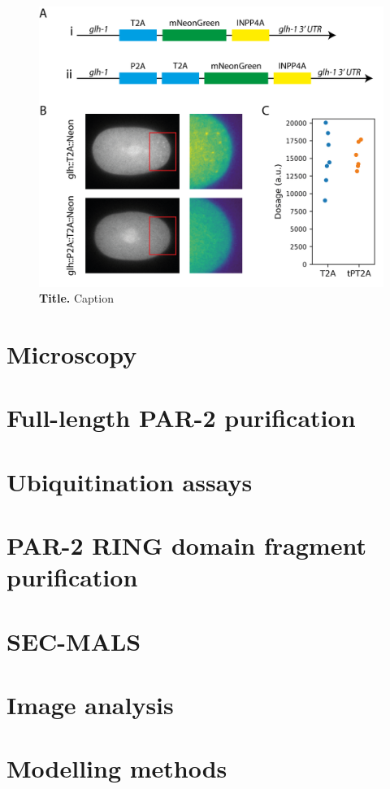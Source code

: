 \documentclass[12pt]{"report"}
\newcommand{\mycaption}[2]{\caption[#1]{\textbf{#1.} #2}}
\begin{document}
\begin{figure}[!h]
\includegraphics[scale=1]{glh}
\setlength{\abovecaptionskip}{20pt}
\centering
\mycaption{Title}{Caption}
\label{fig:glh}
\end{figure}



\section{Microscopy}
\section{Full-length PAR-2 purification}
\section{Ubiquitination assays}
\section{PAR-2 RING domain fragment purification}
\section{SEC-MALS}
\section{Image analysis}
\section{Modelling methods}
\end{document}
